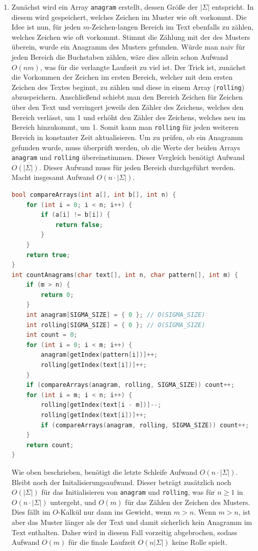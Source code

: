 \documentclass[11pt,a4paper]{article}
\begin{document}
\begin{loesung}
\begin{enumerate}
        \item
        Zunächst wird ein Array \texttt{anagram} erstellt, dessen Größe der $|\Sigma|$ entspricht.
        In diesem wird gespeichert, welches Zeichen im Muster wie oft vorkommt.
        Die Idee ist nun, für jeden $m$-Zeichen-langen Bereich im Text ebenfalls zu zählen, welches Zeichen wie oft vorkommt.
        Stimmt die Zählung mit der des Musters überein, wurde ein Anagramm des Musters gefunden.
        Würde man naiv für jeden Bereich die Buchstaben zählen, wäre dies allein schon Aufwand $O(nm)$, was für die verlangte Laufzeit zu viel ist.
        Der Trick ist, zunächst die Vorkommen der Zeichen im ersten Bereich, welcher mit dem ersten Zeichen des Textes beginnt, zu zählen und diese in einem Array (\texttt{rolling}) abzuspeichern.
        Anschließend schiebt man den Bereich Zeichen für Zeichen über den Text und verringert jeweils den Zähler des Zeichens, welches den Bereich verlässt, um 1 und erhöht den Zähler des Zeichens, welches neu im Bereich hinzukommt, um 1.
        Somit kann man \texttt{rolling} für jeden weiteren Bereich in konstanter Zeit aktualisieren.
        Um zu prüfen, ob ein Anagramm gefunden wurde, muss überprüft werden, ob die Werte der beiden Arrays \texttt{anagram} und \texttt{rolling} übereinstimmen.
        Dieser Vergleich benötigt Aufwand $O(|\Sigma|)$.
        Dieser Aufwand muss für jeden Bereich durchgeführt werden.
        Macht insgesamt Aufwand $O(n\cdot|\Sigma|)$.
        \begin{lstlisting}[language=c++]
bool compareArrays(int a[], int b[], int n) {
    for (int i = 0; i < n; i++) {
        if (a[i] != b[i]) {
            return false;
        }
    }
    return true;
}
int countAnagrams(char text[], int n, char pattern[], int m) {
    if (m > n) {
        return 0;
    }
    int anagram[SIGMA_SIZE] = { 0 }; // O(SIGMA_SIZE)
    int rolling[SIGMA_SIZE] = { 0 }; // O(SIGMA_SIZE)
    int count = 0;
    for (int i = 0; i < m; i++) {
        anagram[getIndex(pattern[i])]++;
        rolling[getIndex(text[i])]++;
    }
    if (compareArrays(anagram, rolling, SIGMA_SIZE)) count++;
    for (int i = m; i < n; i++) {
        rolling[getIndex(text[i - m])]--;
        rolling[getIndex(text[i])]++;
        if (compareArrays(anagram, rolling, SIGMA_SIZE)) count++;
    }
    return count;
}
        \end{lstlisting}
        Wie oben beschrieben, benötigt die letzte Schleife Aufwand $O(n \cdot |\Sigma|)$.
        Bleibt noch der Initalisierungsaufwand.
        Dieser beträgt zusätzlich noch $O(|\Sigma|)$ für das Initialisieren von \texttt{anagram} und \texttt{rolling}, was für $n \geq 1$ in $O(n\cdot |\Sigma|)$ untergeht, und $O(m)$ für das Zählen der Zeichen des Musters.
        Dies fällt im $O$-Kalkül nur dann ins Gewicht, wenn $m > n$.
        Wenn $m > n$, ist aber das Muster länger als der Text und damit sicherlich kein Anagramm im Text enthalten.
        Daher wird in diesem Fall vorzeitig abgebrochen, sodass Aufwand $O(m)$ für die finale Laufzeit $O(n |\Sigma|)$ keine Rolle spielt.


\end{enumerate}
\end{loesung}
\end{document}
